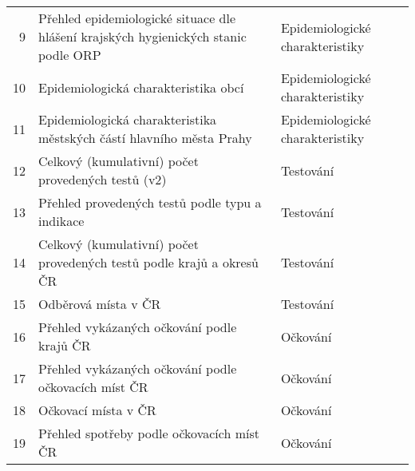 \begin{table}[htbp]
\begin{longtable}{@{}rp{10cm}l@{}}
         9 & Přehled epidemiologické situace dle hlášení krajských hygienických stanic podle ORP                                                                                 & Epidemiologické charakteristiky   \\
        10 & Epidemiologická charakteristika obcí                                                                                                                                & Epidemiologické charakteristiky   \\
        11 & Epidemiologická charakteristika městských částí hlavního města Prahy                                                                                                & Epidemiologické charakteristiky   \\
        12 & Celkový (kumulativní) počet provedených testů (v2)                                                                                                                  & Testování                         \\
        13 & Přehled provedených testů podle typu a indikace                                                                                                                     & Testování                         \\
        14 & Celkový (kumulativní) počet provedených testů podle krajů a okresů ČR                                                                                               & Testování                         \\
        15 & Odběrová místa v ČR                                                                                                                                                 & Testování                         \\
        16 & Přehled vykázaných očkování podle krajů ČR                                                                                                                          & Očkování                          \\
        17 & Přehled vykázaných očkování podle očkovacích míst ČR                                                                                                                & Očkování                          \\
        18 & Očkovací místa v ČR                                                                                                                                                 & Očkování                          \\
        19 & Přehled spotřeby podle očkovacích míst ČR                                                                                                                           & Očkování                          \\

\end{longtable}
\end{table}
